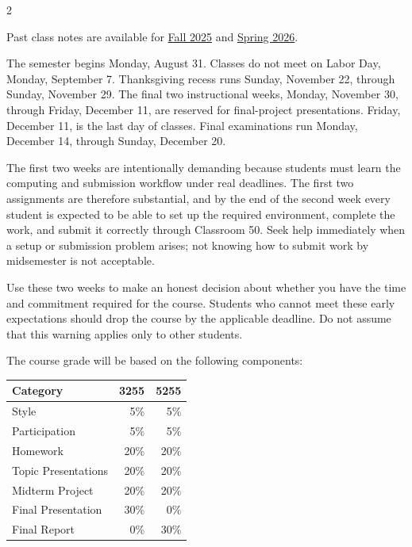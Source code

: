 \documentclass{article}
\begin{document}
\begin{multicols}{2}
\begin{description}
  Past class notes are available for
  \href{https://statds.github.io/ids-f25}{Fall 2025} and
  \href{https://statds.github.io/ids-s26}{Spring 2026}.

\item[Fall 2026 Calendar:]
  The semester begins Monday, August 31. Classes do not meet on Labor Day,
  Monday, September 7. Thanksgiving recess runs Sunday, November 22, through
  Sunday, November 29. The final two instructional weeks, Monday, November 30,
  through Friday, December 11, are reserved for final-project presentations.
  Friday, December 11, is the last day of classes. Final examinations run
  Monday, December 14, through Sunday, December 20.

\item[The First Two Weeks:]
  The first two weeks are intentionally demanding because students must learn
  the computing and submission workflow under real deadlines. The first two
  assignments are therefore substantial, and by the end of the second week
  every student is expected to be able to set up the required environment,
  complete the work, and submit it correctly through Classroom 50. Seek
  help immediately when a setup or submission problem arises; not knowing how
  to submit work by midsemester is not acceptable.

  Use these two weeks to make an honest decision about whether you have the
  time and commitment required for the course. Students who cannot meet these
  early expectations should drop the course by the applicable deadline. Do
  not assume that this warning applies only to other students.

\item[Grading:]
The course grade will be based on the following components:
\begin{center}
  \begin{tabular}{lrr}
    \toprule
    Category              & 3255  & 5255\\
    \midrule
    Style                 & 5\%  & 5\%\\
    Participation         & 5\%  & 5\%\\
    Homework              & 20\% & 20\%\\
    Topic Presentations   & 20\% & 20\%\\
    Midterm Project       & 20\% & 20\%\\
    Final Presentation    & 30\% & 0\%\\
    Final Report          & 0\%  & 30\%\\
    \bottomrule
  \end{tabular}
\end{center}


\end{description}
\end{multicols}
\end{document}
